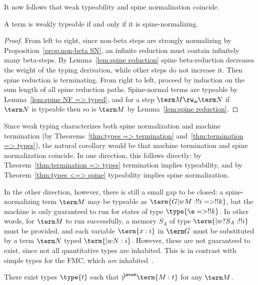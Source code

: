 \documentclass[a4paper,UKenglish,cleveref, autoref, thm-restate]{lipics-v2021}
\newcommand\notdashweak{\makebox[3pt][l]{$\not{\kern-2pt{\vdash}}$}\raisebox{5pt}{$\scriptstyle\weak$}}
\newcommand\spine{\mathsf w}
\begin{document}
It now follows that weak typeability and spine normalization coincide.


\begin{theorem}
\label{thm:types <=> spine}
A term is weakly typeable if and only if it is spine-normalizing.
\end{theorem}

\begin{proof}
From left to right, since non-beta steps are strongly normalizing by Proposition~\ref{prop:non-beta SN}, an infinite reduction must contain infinitely many beta-steps. By Lemma~\ref{lem:spine reduction} spine beta-reduction decreases the weight of the typing derivation, while other steps do not increase it. Then spine reduction is terminating. From right to left, proceed by induction on the sum length of all spine reduction paths. Spine-normal terms are typeable by Lemma~\ref{lem:spine NF => typed}, and for a step $\term M\rw_\spine\term N$ if $\term N$ is typeable then so is $\term M$ by Lemma~\ref{lem:spine reduction}.
\end{proof}

Since weak typing characterizes both spine normalization and machine termination (by Theorems~\ref{thm:types => termination} and~\ref{thm:termination => types}), the natural corollary would be that machine termination and spine normalization coincide. In one direction, this follows directly: by Theorem~\ref{thm:termination => types} termination implies typeability, and by Theorem~\ref{thm:types <=> spine} typeability implies spine normalization.

In the other direction, however, there is still a small gap to be closed: a spine-normalizing term $\term M$ may be typeable as $\term{G |w M: !!i => !!k}$, but the machine is only guaranteed to run for states of type $\type{\e => !!k}$. In other words, for $\term M$ to run successfully, a memory $S_A$ of type $\term{|w ?{S_A}:!!i}$ must be provided, and each variable $\term{x:i}$ in $\term G$ must be substituted by a term $\term N$ typed $\term{|w N:i}$. However, these are not guaranteed to exist, since not all quantitative types are inhabited. This is in contrast with simple types for the FMC, which \emph{are} inhabited~\cite[Remark 3.7]{Heijltjes-2022}.



\begin{proposition}
There exist types $\type{t}$ such that $\notdashweak\term{M:t}$ for any $\term M$.
\end{proposition}
\end{document}
